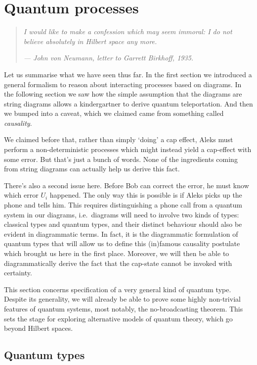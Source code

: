 \documentclass[10pt]{article}
\begin{document}
\section{Quantum processes}

\begin{quote}
\em I would like to make a confession which may seem immoral: I do not believe   
absolutely in Hilbert space any more.\par \em \hfill    --- John von Neumann, letter to Garrett Birkhoff, 1935.         
\end{quote}

\noindent
Let us summarise what we have seen thus far.  In the first section we introduced a general formalism to reason about interacting processes based on diagrams.  In the following section we saw how the simple assumption that the diagrams are string diagrams allows a kindergartner to derive quantum teleportation. And then we bumped into a caveat, which we claimed came from something called \textit{causality}.

We claimed before that, rather than simply `doing' a cap effect, Aleks must perform a non-deterministic processes which might instead yield a cap-effect with some error. But that's just a bunch of words. None of the ingredients coming from string diagrams can actually help us derive this fact.

There's also a second issue here. Before Bob can correct the error, he must know which error $U_i$ happened. The only way this is possible is if Aleks picks up the phone and tells him. This requires distinguishing a phone call from a quantum system in our diagrams, i.e.~diagrams will need to involve two kinds of types: classical types and quantum types, and their distinct behaviour should also be evident in diagrammatic terms. In fact, it is the diagrammatic  formulation of quantum types that will allow us to  define this (in)famous causality postulate  which brought us here in the first place. Moreover, we will then be able to diagrammatically derive the fact that the cap-state cannot be invoked with certainty.

This section concerns specification of a  very general kind of quantum type.  Despite its generality, we will already be able to prove some highly non-trivial features of quantum systems, most notably, the no-broadcasting theorem.  This sets the stage for exploring alternative models  of quantum theory, which go beyond Hilbert spaces.

\subsection{Quantum types}
\end{document}
